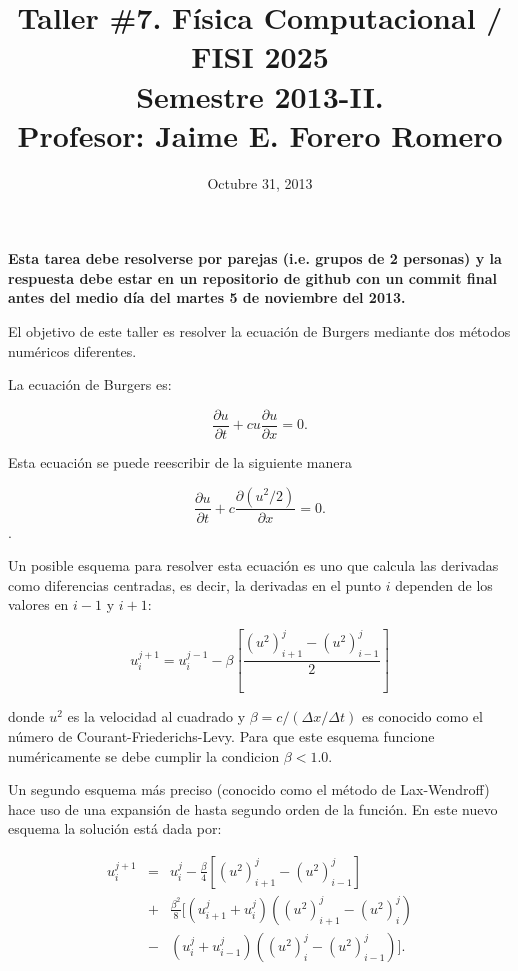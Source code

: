 \documentclass{article}
\title{Taller \#7. F\'isica Computacional / FISI 2025 \\Semestre
  2013-II. \\ Profesor: Jaime E. Forero Romero}
\date{Octubre 31, 2013}
\begin{document}
\maketitle

{\bf Esta tarea debe resolverse por parejas (i.e. grupos de 2
  personas) y la respuesta debe estar en un repositorio de github con
  un commit final antes del medio d\'ia del martes 5 de noviembre del
  2013.} 

El objetivo de este taller es resolver la ecuaci\'on de Burgers
mediante dos m\'etodos num\'ericos diferentes. 

La ecuaci\'on de Burgers es:

\begin{equation}
\frac{\partial u}{\partial t} +cu\frac{\partial u}{\partial x}=0.
\end{equation}

Esta ecuaci\'on se puede reescribir de la siguiente manera

\begin{equation}
\frac{\partial u}{\partial t} +c\frac{\partial (u^2/2)}{\partial x}=0.
\label{eq:uno}
\end{equation}.

Un posible esquema para resolver esta ecuaci\'on es uno que calcula
las derivadas como diferencias centradas, es decir, la derivadas en el
punto $i$ dependen de los valores en $i-1$ y $i+1$:

\begin{equation}
u_i^{j+1} = u_i^{j-1} - \beta\left[\frac{(u^2)_{i+1}^j - (u^2)_{i-1}^j}{2}\right]
\end{equation}

donde $u^2$ es la velocidad al cuadrado y $\beta=c/(\Delta x/\Delta t)$
es conocido como el n\'umero de Courant-Friederichs-Levy. Para que
este esquema funcione num\'ericamente se debe cumplir la condicion
$\beta<1.0$.

Un segundo esquema m\'as preciso (conocido como el m\'etodo de
Lax-Wendroff) hace uso de una expansi\'on de hasta segundo
orden de la funci\'on. En este nuevo esquema la soluci\'on est\'a dada
por: 

\begin{eqnarray}
u_i^{j+1} &=& u_i^{j} - \frac{\beta}{4}[(u^2)^{j}_{i+1} -
  (u^2)_{i-1}^j]\\ \nonumber
& + &\frac{\beta^2}{8}[(u_{i+1}^j + u_i^j)((u^2)_{i+1}^j -
  (u^2)_{i}^{j})\\\nonumber
& - &(u_i^j+u_{i-1}^j)((u^2)_i^j - (u^2)_{i-1}^j)].
\label{eq:dos}
\end{eqnarray}
\end{document}
